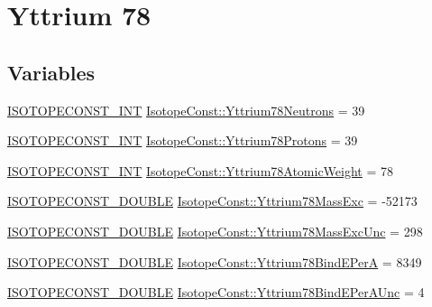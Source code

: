 \hypertarget{group___isotope_const-_yttrium-_y78}{}\section{Yttrium 78}
\label{group___isotope_const-_yttrium-_y78}
\subsection*{Variables}
\begin{DoxyCompactItemize}
\item 
\mbox{\hyperlink{group___isotope_const-_macros_ga5f18360b3e99483a35c32d789e62621c}{I\+S\+O\+T\+O\+P\+E\+C\+O\+N\+S\+T\+\_\+\+I\+NT}} \mbox{\hyperlink{group___isotope_const-_yttrium-_y78_ga23ee5aedcfdd2393b6d9cab9754754e6}{Isotope\+Const\+::\+Yttrium78\+Neutrons}} = 39
\item 
\mbox{\hyperlink{group___isotope_const-_macros_ga5f18360b3e99483a35c32d789e62621c}{I\+S\+O\+T\+O\+P\+E\+C\+O\+N\+S\+T\+\_\+\+I\+NT}} \mbox{\hyperlink{group___isotope_const-_yttrium-_y78_ga2beb5e8419ea8bddf4216474f9b68eec}{Isotope\+Const\+::\+Yttrium78\+Protons}} = 39
\item 
\mbox{\hyperlink{group___isotope_const-_macros_ga5f18360b3e99483a35c32d789e62621c}{I\+S\+O\+T\+O\+P\+E\+C\+O\+N\+S\+T\+\_\+\+I\+NT}} \mbox{\hyperlink{group___isotope_const-_yttrium-_y78_gadca4ba34dd02f020b9eeb4a2a775d875}{Isotope\+Const\+::\+Yttrium78\+Atomic\+Weight}} = 78
\item 
\mbox{\hyperlink{group___isotope_const-_macros_ga8f45a7272ce02c0b4c65c44636ed719a}{I\+S\+O\+T\+O\+P\+E\+C\+O\+N\+S\+T\+\_\+\+D\+O\+U\+B\+LE}} \mbox{\hyperlink{group___isotope_const-_yttrium-_y78_gadadfdb67688e45b7f755390d6cf1dd97}{Isotope\+Const\+::\+Yttrium78\+Mass\+Exc}} = -\/52173
\item 
\mbox{\hyperlink{group___isotope_const-_macros_ga8f45a7272ce02c0b4c65c44636ed719a}{I\+S\+O\+T\+O\+P\+E\+C\+O\+N\+S\+T\+\_\+\+D\+O\+U\+B\+LE}} \mbox{\hyperlink{group___isotope_const-_yttrium-_y78_ga1901e3be28987f5424855f2689c91c3b}{Isotope\+Const\+::\+Yttrium78\+Mass\+Exc\+Unc}} = 298
\item 
\mbox{\hyperlink{group___isotope_const-_macros_ga8f45a7272ce02c0b4c65c44636ed719a}{I\+S\+O\+T\+O\+P\+E\+C\+O\+N\+S\+T\+\_\+\+D\+O\+U\+B\+LE}} \mbox{\hyperlink{group___isotope_const-_yttrium-_y78_ga6acde79b6616583d78bf1073b8abc306}{Isotope\+Const\+::\+Yttrium78\+Bind\+E\+PerA}} = 8349
\item 
\mbox{\hyperlink{group___isotope_const-_macros_ga8f45a7272ce02c0b4c65c44636ed719a}{I\+S\+O\+T\+O\+P\+E\+C\+O\+N\+S\+T\+\_\+\+D\+O\+U\+B\+LE}} \mbox{\hyperlink{group___isotope_const-_yttrium-_y78_ga8678dad58a4f3b3fee9c6cff1a2a9460}{Isotope\+Const\+::\+Yttrium78\+Bind\+E\+Per\+A\+Unc}} = 4

\end{DoxyCompactItemize}
